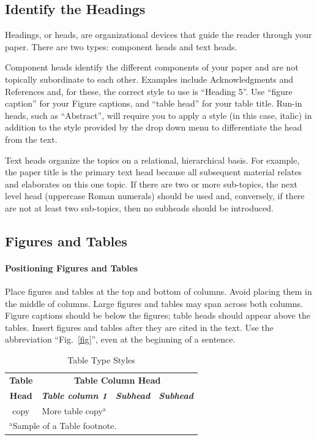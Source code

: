 \documentclass[conference]{IEEEtran}
\begin{document}
\subsection{Identify the Headings}
Headings, or heads, are organizational devices that guide the reader through 
your paper. There are two types: component heads and text heads.

Component heads identify the different components of your paper and are not 
topically subordinate to each other. Examples include Acknowledgments and 
References and, for these, the correct style to use is ``Heading 5''. Use 
``figure caption'' for your Figure captions, and ``table head'' for your 
table title. Run-in heads, such as ``Abstract'', will require you to apply a 
style (in this case, italic) in addition to the style provided by the drop 
down menu to differentiate the head from the text.

Text heads organize the topics on a relational, hierarchical basis. For 
example, the paper title is the primary text head because all subsequent 
material relates and elaborates on this one topic. If there are two or more 
sub-topics, the next level head (uppercase Roman numerals) should be used 
and, conversely, if there are not at least two sub-topics, then no subheads 
should be introduced.

\subsection{Figures and Tables}
\paragraph{Positioning Figures and Tables} Place figures and tables at the top and 
bottom of columns. Avoid placing them in the middle of columns. Large 
figures and tables may span across both columns. Figure captions should be 
below the figures; table heads should appear above the tables. Insert 
figures and tables after they are cited in the text. Use the abbreviation 
``Fig.~\ref{fig}'', even at the beginning of a sentence.
\begin{table}[htbp]
\caption{Table Type Styles}
\begin{center}
\begin{tabular}{|c|c|c|c|}
\hline
\textbf{Table}&\multicolumn{3}{|c|}{\textbf{Table Column Head}} \\
\cline{2-4} 
\textbf{Head} & \textbf{\textit{Table column 1}}& \textbf{\textit{Subhead}}& \textbf{\textit{Subhead}} \\
\hline
copy& More table copy$^{\mathrm{a}}$& &  \\
\hline
\multicolumn{4}{l}{$^{\mathrm{a}}$Sample of a Table footnote.}
\end{tabular}
\label{tab1}
\end{center}
\end{table}
\end{document}

